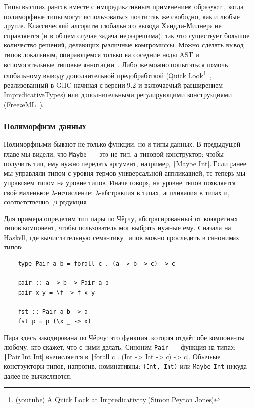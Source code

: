 Типы высших рангов вместе с импредикативным применением образуют , когда полиморфные типы могут использоваться почти так же свободно, как и любые другие.
Классический алгоритм глобального вывода Хиндли-Милнера не справляется (и в общем случае задача неразрешима), так что существует большое количество решений, делающих различные компромиссы.
Можно сделать вывод типов локальным, опирающемся только на соседние ноды AST и вспомогательные типовые аннотации~\cite{pierce2000local, christiansen2013bidirectional, dunfield2019sound}.
Либо же можно попытаться помочь глобальному выводу дополнительной предобработкой (Quick Look\footnote{\href{https://youtu.be/ZuNMo136QqI?si=qp8PAEeeF-bioCB_}{(youtube) A Quick Look at Impredicativity (Simon Peyton Jones)}}~\cite{serrano2020quick}, реализованный в GHC начиная с версии 9.2 и включаемый расширением ImpredicativeTypes) или дополнительными регулирующими конструкциями (FreezeML~\cite{emrich2020freezeml}).


\subsubsection{Полиморфизм данных}

Полиморфными бывают не только функции, но и типы данных.
В предыдущей главе мы видели, что \texttt{Maybe}~--- это не тип, а типовой конструктор: чтобы получить тип, ему нужно передать аргумент, например, \texttt|Maybe Int|.
Если ранее мы управляли типом с уровня термов универсальной аппликацией, то теперь мы управляем типом на уровне типов.
Иначе говоря, на уровне типов появляется своё маленькое $\lambda$-исчисление: $\lambda$-абстракция в типах, аппликация в типах и, соответственно, $\beta$-редукция.

Для примера определим тип пары по Чёрчу, абстрагированный от конкретных типов компонент, чтобы пользователь мог выбрать нужные ему.
Сначала на Haskell, где вычислительную семантику типов можно проследить в синонимах типов:
\begin{verbatim}
    type Pair a b = forall c . (a -> b -> c) -> c

    pair :: a -> b -> Pair a b
    pair x y = \f -> f x y

    fst :: Pair a b -> a
    fst p = p (\x _ -> x)
\end{verbatim}
Пара здесь закодирована по Чёрчу: это функция, которая отдаёт обе компоненты любому, кто скажет, что с ними делать.
Синоним \texttt{Pair}~--- функция на типах: \texttt|Pair Int Int| вычисляется в \texttt|forall c . (Int -> Int -> c) -> c|.
Обычные конструкторы типов, напротив, номинативны: \texttt{(Int, Int)} или \texttt{Maybe Int} никуда далее не вычисляются.

